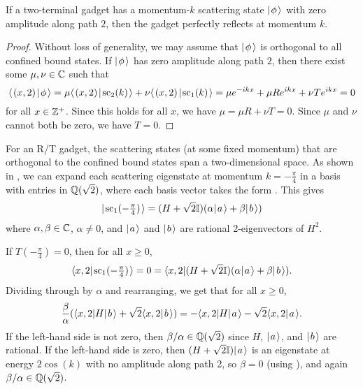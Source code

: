 \documentclass[../thesis-main/thesis-main]{subfiles}
\begin{document}
\begin{fact}\label{fct:zero_ampl}
If a two-terminal gadget has a momentum-$k$ scattering state $|\mspace{2mu} \phi \mspace{2mu} \rangle$ with zero amplitude along path $2$, then the gadget perfectly reflects at momentum $k$.
\end{fact}


\begin{proof}
Without loss of generality, we may assume that $|\mspace{2mu} \phi \mspace{2mu} \rangle$ is orthogonal to all confined bound states.
If $|\mspace{2mu} \phi \mspace{2mu} \rangle$ has zero amplitude along path $2$, then there exist some $\mu,\nu \in \mathbb{C}$ such that
\begin{equation}
  \langle\mspace{2mu} (x,2) \mspace{2mu} | \mspace{2mu} \phi\mspace{2mu} \rangle
  = \mu \langle\mspace{2mu} (x,2) \mspace{2mu} | \mspace{2mu} \text{sc}_2 (k)\mspace{2mu} \rangle + \nu \langle\mspace{2mu} (x,2) \mspace{2mu} | \mspace{2mu} \text{sc}_1(k)\mspace{2mu} \rangle
  = \mu e^{-ikx} + \mu R e^{ikx} + \nu T e^{ikx}
  = 0
\end{equation} 
for all $x\in \mathbb{Z}^{+}$.  Since this holds for all $x$, we have $\mu = \mu R + \nu T = 0$.  Since $\mu$ and $\nu$ cannot both be zero, we have $T=0$.
\end{proof}

For an R/T gadget, the scattering states (at some fixed momentum) that are orthogonal to the confined bound states span a two-dimensional space. As shown in , we can expand each scattering eigenstate at momentum $k=-\frac{\pi}{4}$ in a basis with entries in $\mathbb{Q}(\sqrt{2})$, where each basis vector takes the form . This gives
\begin{equation*}
  |\mspace{2mu} \text{sc}_{1}(-\tfrac{\pi}{4}) \mspace{2mu} \rangle 
  = (H + \sqrt{2}\mathbb{I}) (\alpha |\mspace{2mu} a \mspace{2mu} \rangle + \beta |\mspace{2mu} b \mspace{2mu} \rangle) \label{eq:rat_expansion}
\end{equation*}
where $\alpha,\beta \in \mathbb{C}$, $\alpha\neq 0$, and $|\mspace{2mu} a \mspace{2mu} \rangle$ and $|\mspace{2mu} b \mspace{2mu} \rangle$ are rational 2-eigenvectors of $H^2$.

If $T(-\frac{\pi}{4}) = 0$, then for all $x \geq 0$, 
\begin{equation}
  \langle x,2|\mspace{2mu} \text{sc}_1(-\tfrac{\pi}{4}) \mspace{2mu} \rangle 
  = 0 
  = \langle{x,2} |(H + \sqrt{2}\mathbb{I}) (\alpha |\mspace{2mu} a \mspace{2mu} \rangle + \beta |\mspace{2mu} b \mspace{2mu} \rangle).
\end{equation}
Dividing through by $\alpha$ and rearranging, we get that for all $x\geq 0$,
\begin{equation*}
\frac{\beta}{\alpha} (\langle{x,2}| H|\mspace{2mu} b \mspace{2mu} \rangle+\sqrt{2} \langle{x,2}|\mspace{2mu} b \mspace{2mu} \rangle)
  =-\langle{x,2}| H|\mspace{2mu} a \mspace{2mu} \rangle  -\sqrt{2} \langle{x,2}|\mspace{2mu} a \mspace{2mu} \rangle.
\label{eq:cases_eqn}
\end{equation*}
If the left-hand side is not zero, then $\beta/\alpha \in \mathbb{Q}(\sqrt{2})$ since $H$, $|\mspace{2mu} a \mspace{2mu} \rangle$, and $|\mspace{2mu} b \mspace{2mu} \rangle$ are rational.  If the left-hand side is zero, then $(H+ \sqrt{2}\mathbb{I})|\mspace{2mu} a \mspace{2mu} \rangle$ is an eigenstate at energy $2\cos(k)$ with no amplitude along path 2, so $\beta = 0$ (using ), and again $\beta/\alpha \in \mathbb{Q}(\sqrt{2})$.
\end{document}
